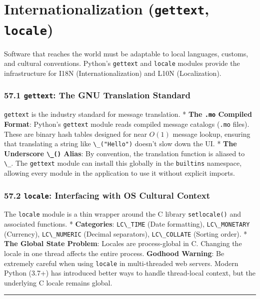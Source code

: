 \hypertarget{internationalization-gettext-locale}{%
\chapter{\texorpdfstring{Internationalization (\texttt{gettext},
\texttt{locale})}{Internationalization (gettext, locale)}}\label{internationalization-gettext-locale}}

Software that reaches the world must be adaptable to local languages,
customs, and cultural conventions. Python's
\passthrough{\lstinline!gettext!} and \passthrough{\lstinline!locale!}
modules provide the infrastructure for I18N (Internationalization) and
L10N (Localization).

\hypertarget{gettext-the-gnu-translation-standard}{%
\subsection{\texorpdfstring{57.1 \texttt{gettext}: The GNU Translation
Standard}{57.1 gettext: The GNU Translation Standard}}\label{gettext-the-gnu-translation-standard}}

\passthrough{\lstinline!gettext!} is the industry standard for message
translation. * \textbf{The \passthrough{\lstinline!.mo!} Compiled
Format}: Python's \passthrough{\lstinline!gettext!} module reads
compiled message catalogs (\passthrough{\lstinline!.mo!} files). These
are binary hash tables designed for near \(O(1)\) message lookup,
ensuring that translating a string like
\passthrough{\lstinline!\_("Hello")!} doesn't slow down the UI. *
\textbf{The Underscore \passthrough{\lstinline!\_()!} Alias}: By
convention, the translation function is aliased to
\passthrough{\lstinline!\_!}. The \passthrough{\lstinline!gettext!}
module can install this globally in the
\passthrough{\lstinline!builtins!} namespace, allowing every module in
the application to use it without explicit imports.

\hypertarget{locale-interfacing-with-os-cultural-context}{%
\subsection{\texorpdfstring{57.2 \texttt{locale}: Interfacing with OS
Cultural
Context}{57.2 locale: Interfacing with OS Cultural Context}}\label{locale-interfacing-with-os-cultural-context}}

The \passthrough{\lstinline!locale!} module is a thin wrapper around the
C library \passthrough{\lstinline!setlocale()!} and associated
functions. * \textbf{Categories}: \passthrough{\lstinline!LC\_TIME!}
(Date formatting), \passthrough{\lstinline!LC\_MONETARY!} (Currency),
\passthrough{\lstinline!LC\_NUMERIC!} (Decimal separators),
\passthrough{\lstinline!LC\_COLLATE!} (Sorting order). * \textbf{The
Global State Problem}: Locales are process-global in C. Changing the
locale in one thread affects the entire process. \textbf{Godhood
Warning}: Be extremely careful when using
\passthrough{\lstinline!locale!} in multi-threaded web servers. Modern
Python (3.7+) has introduced better ways to handle thread-local context,
but the underlying C locale remains global.

\begin{center}\rule{0.5\linewidth}{0.5pt}\end{center}
